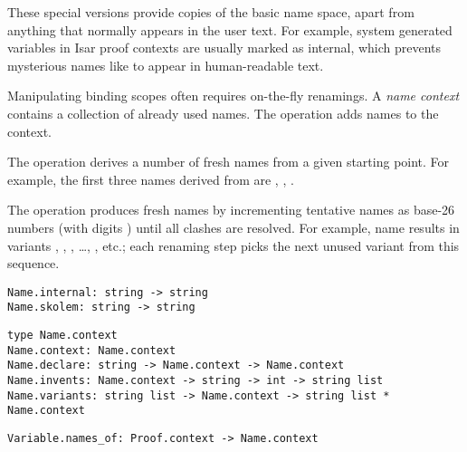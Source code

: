 \begin{isabellebody}
\begin{isamarkuptext}
  These special versions provide copies of the basic name space, apart
  from anything that normally appears in the user text.  For example,
  system generated variables in Isar proof contexts are usually marked
  as internal, which prevents mysterious names like  to
  appear in human-readable text.

  \medskip Manipulating binding scopes often requires on-the-fly
  renamings.  A \emph{name context} contains a collection of already
  used names.  The  operation adds names to the
  context.

  The  operation derives a number of fresh names from
  a given starting point.  For example, the first three names derived
  from  are , , .

  The  operation produces fresh names by
  incrementing tentative names as base-26 numbers (with digits ) until all clashes are resolved.  For example, name  results in variants , , , \dots, ,  etc.; each renaming
  step picks the next unused variant from this sequence.%
\end{isamarkuptext}%
\isamarkuptrue%
%
\isadelimmlref
%
\endisadelimmlref
%
\isatagmlref
%
\begin{isamarkuptext}%
\begin{mldecls}
  \verb|Name.internal: string -> string| \\
  \verb|Name.skolem: string -> string| \\
  \end{mldecls}
  \begin{mldecls}
  \verb|type Name.context| \\
  \verb|Name.context: Name.context| \\
  \verb|Name.declare: string -> Name.context -> Name.context| \\
  \verb|Name.invents: Name.context -> string -> int -> string list| \\
  \verb|Name.variants: string list -> Name.context -> string list * Name.context| \\
  \end{mldecls}
  \begin{mldecls}
  \verb|Variable.names_of: Proof.context -> Name.context| \\
  \end{mldecls}


\end{isamarkuptext}
\end{isabellebody}
